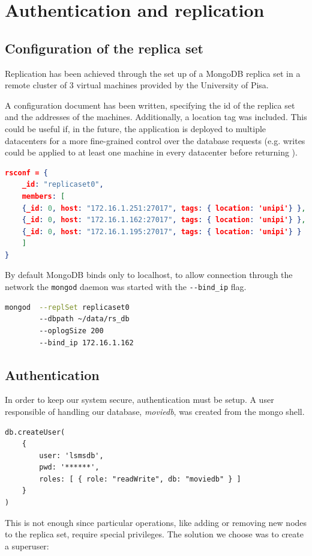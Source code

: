 \documentclass[11pt]{article}
\begin{document}
\section{Authentication and replication}
\subsection{Configuration of the replica set}
Replication has been achieved through the set up of a MongoDB replica set in a remote cluster of 3 virtual machines provided by the University of Pisa.

A configuration document has been written, specifying the id of the replica set and the addresses of the machines. Additionally, a location tag was included. This could be useful if, in the future, the application is deployed to multiple datacenters for a more fine-grained control over the database requests (e.g. writes could be applied to at least one machine in every datacenter before returning ). 

\begin{lstlisting}[language=json]	
rsconf = {
	_id: "replicaset0",
	members: [
	{_id: 0, host: "172.16.1.251:27017", tags: { location: 'unipi'} },
	{_id: 0, host: "172.16.1.162:27017", tags: { location: 'unipi'} },
	{_id: 0, host: "172.16.1.195:27017", tags: { location: 'unipi'} }
	]
}
\end{lstlisting}

By default MongoDB binds only to localhost, to allow connection through the network the \lstinline{mongod} daemon was started with the \lstinline{--bind_ip} flag.

\begin{lstlisting}[language=bash]
mongod 	--replSet replicaset0
		--dbpath ~/data/rs_db
		--oplogSize 200 
		--bind_ip 172.16.1.162
\end{lstlisting}
\subsection{Authentication}
In order to keep our system secure, authentication must be setup.
A user responsible of handling our database, \textit{moviedb}, was created from the mongo shell.
\begin{lstlisting}
db.createUser(
	{
		user: 'lsmsdb',
		pwd: '******',
		roles: [ { role: "readWrite", db: "moviedb" } ]
	}
)
\end{lstlisting}

This is not enough since particular operations, like adding or removing new nodes to the replica set, require special privileges. The solution we choose was to create a superuser:
\end{document}
